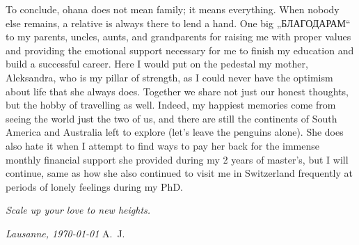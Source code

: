 To conclude, ohana does not mean family; it means everything. When nobody else remains, a relative is always there to lend a hand. One big 
„БЛАГОДАРАМ“
to my parents, uncles, aunts, and grandparents for raising me with proper values and providing the emotional support necessary for me to finish my education and build a successful career. Here I would put on the pedestal my mother, Aleksandra, who is my pillar of strength, as I could never have the optimism about life that she always does. Together we share not just our honest thoughts, but the hobby of travelling as well. Indeed, my happiest memories come from seeing the world just the two of us, and there are still the continents of South America and Australia left to explore (let's leave the penguins alone). She does also hate it when I attempt to find ways to pay her back for the immense monthly financial support she provided during my 2 years of master's, but I will continue, same as how she also continued to visit me in Switzerland frequently at periods of lonely feelings during my PhD. 

\bigskip

\begin{center}
    \emph{{\LARGE Scale up your love to new heights.}}
\end{center}

\bigskip
 
\noindent\textit{Lausanne, \today}
\hfill A.~J.
